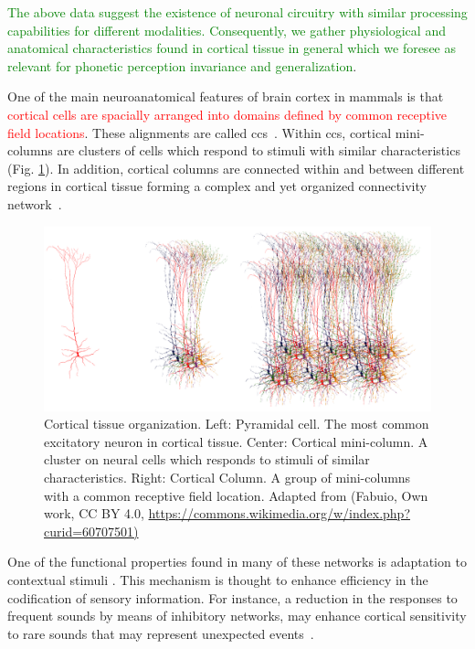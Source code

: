 \documentclass[10pt,letterpaper]{article}
\begin{document}
\textcolor{green}{The above data suggest the existence of neuronal circuitry with similar processing capabilities for different modalities. Consequently, we gather physiological and anatomical characteristics found in cortical tissue in general which we foresee as relevant for phonetic perception invariance and generalization}.

One of the main neuroanatomical features of brain cortex in mammals is that \textcolor{red}{cortical cells are spacially arranged into domains defined by common receptive field locations}. These alignments are called \glspl{cc}~\cite{mountcastle_1955, mountcastle_1957, hubel_1962, hubel_1968}. Within \glspl{cc}, cortical mini-columns are clusters of cells which respond to stimuli with similar characteristics (Fig. \ref{fig:Biological}). In addition, cortical columns are connected within and between different regions in cortical tissue forming a complex and yet organized connectivity network~\cite{mountcastle_1997}. 

\begin{figure}[h!]
    \centering
    \includegraphics[width=1.0\textwidth]{Biological.png}
    \caption{Cortical tissue organization. Left: Pyramidal cell. The most common excitatory neuron in cortical tissue.
    Center: Cortical mini-column. A cluster on neural cells which responds to stimuli of similar characteristics.
    Right: Cortical Column. A group of mini-columns with a common receptive field location.
    Adapted from (Fabuio, Own work, CC BY 4.0, \url{https://commons.wikimedia.org/w/index.php?curid=60707501)}}
    \label{fig:Biological}
\end{figure}

One of the functional properties found in many of these networks is adaptation to contextual stimuli \cite{KRAUSE201436,doi:10.1167/16.13.1}. This mechanism is thought to enhance efficiency in the codification of sensory information. For instance, a reduction in the responses to frequent sounds by means of inhibitory networks, may enhance cortical sensitivity to rare sounds that may represent unexpected events~\cite{Natan2015ComplementaryCO,nachum_2003,Javitt11962}.
\end{document}
